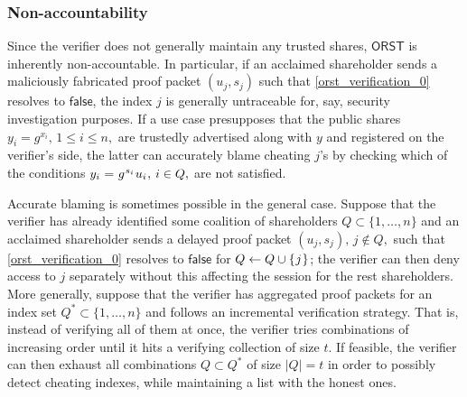 \documentclass{iacrtrans}
\begin{document}
\subsubsection{Non-accountability}\label{section_non_accountability}
Since the verifier does not generally
maintain any trusted shares,
$\mathsf{ORST}$ is inherently non-accountable.
In particular, if an acclaimed shareholder sends
a maliciously fabricated proof packet $(u_j, s_j)$
such that \eqref{orst_verification_0}
resolves to $\mathsf{false}$, the index $j$
is generally untraceable
for, say, security investigation purposes.
If a use case presupposes that the
public shares $y_i=g^{x_i},\hspace{2pt} 1 \le i \le n,$
are trustedly advertised along with $y$
and registered on the verifier's side,
the latter can accurately blame cheating $j$'s by
checking which of the conditions
$
y_i \hspace{0.5pt}
=
\hspace{0.5pt}
g^{\hspace{0.5pt}s_i}\hspace{0.5pt} u_i\hspace{0.5pt},
\hspace{2pt} i \in Q,
$
are not satisfied.

Accurate blaming is sometimes possible in the general case.
Suppose that the verifier has already
identified some coalition of shareholders
$Q \subset \{1, \dots, n\}$
and an acclaimed shareholder sends a delayed proof packet
$(u_j, s_j),\hspace{2pt} j \not \in Q,$ such that
\eqref{orst_verification_0}
resolves to $\mathsf{false}$
for $Q \leftarrow Q \cup \{\hspace{0.5pt}j\hspace{0.5pt}\}$;
the verifier can then deny access to $j$ separately
without this affecting the session for the rest shareholders.
More generally, suppose that the verifier has aggregated
proof packets for an index set $Q^* \subset \{1, \dots, n\}$
and follows an incremental verification strategy.
That is, instead of verifying all of them at once,
the verifier tries combinations of increasing order until
it hits a verifying collection of size $t$.
If feasible, the verifier can then exhaust all combinations
$Q \subset Q^*$ of size $|Q| = t$ in order
to possibly detect cheating indexes, while maintaining a list
with the honest ones.
\end{document}
